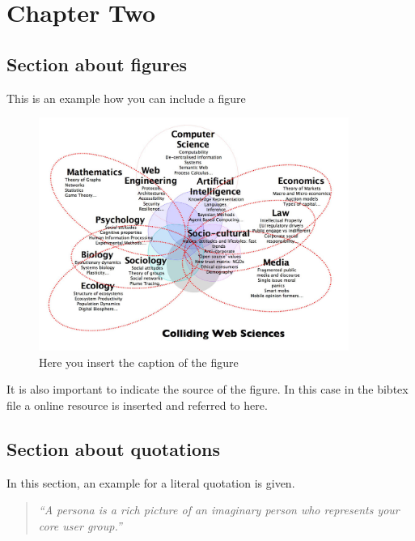 
\chapter{Chapter Two} %
\label{cha:chapter_two}

\section{Section about figures} %
\label{sec:section_about_figures}

This is an example how you can include a figure

\begin{figure}[!ht]
	\centering
		\includegraphics[height=3in]{images/webscience.jpg}
	\caption{Here you insert the caption of the figure \citep{Stanford09}}
	\label{fig:images_webscience}
\end{figure}

It is also important to indicate the source of the figure. In this case in the bibtex file a online resource is inserted and referred to here.



\section{Section about quotations} %
\label{sec:section_about_quotations}

In this section, an example for a literal quotation is given. 

\begin{quotation}
	\emph{``A persona is a rich picture of an imaginary person who represents your core user group.''}
	\citep{Dix04}
\end{quotation}

